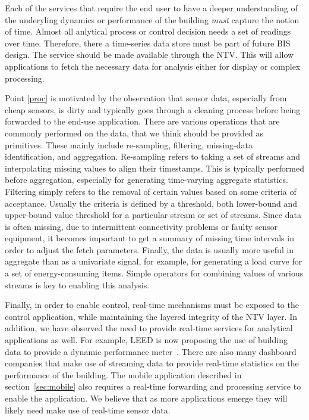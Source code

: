 Each of the services that require the end user to have a deeper understanding of the underyling dynamics or performance
of the building \emph{must} capture the notion of time.  Almost all anlytical process or control decision needs a set of readings
over time.  Therefore, there a time-series data store must be part of future BIS design.  The service should be made available
through the NTV.  This will allow applications to fetch the necessary data for analysis either for display or complex processing.

Point \ref{proc} is motivated by the observation that sensor data, especially from cheap sensors, is dirty and typically goes
through a cleaning process before being forwarded to the end-use application.  There are various operations that are commonly
performed on the data, that we think should be provided as primitives.  These mainly include re-sampling, filtering,  
missing-data identification, and aggregation.  Re-sampling refers to taking a set of streams and interpolating missing values to 
align their timestamps.  This is typically performed before aggregation, especially for generating time-varying aggregate statistics.
Filtering simply refers to the removal of certain values based on some criteria of acceptance.  Usually the criteria is defined
by a threshold, both lower-bound and upper-bound value threshold for a particular stream or set of streams.
Since data is often missing, due to intermittent connectivity problems or faulty sensor equipment, it becomes important to 
get a summary of missing time intervals in order to adjust the fetch parameters.  Finally, the data is usually more
useful in aggregate than as a univariate signal, for example, for generating a load curve for a set of energy-consuming items.
Simple operators for combining values of various streams is key to enabling this analysis.

Finally, in order to enable control, real-time mechanisms must be exposed to the control application, while maintaining the 
layered integrity of the NTV layer.  In addition, we have observed the need to provide real-time services for analytical applications
as well.  For example, LEED is now proposing the use of building data to provide a dynamic performance meter~\cite{DynamicLeed}.
There are also many dashboard companies that make use of streaming data to provide real-time statistics on the performance of the
building.  The mobile application described in section~\ref{sec:mobile} also requires a real-time forwarding and processing service to
enable the application.  We believe that as more applications emerge they will likely need make use of real-time sensor data.


